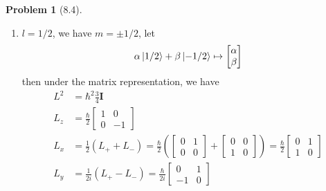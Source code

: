 \documentclass[twoside,11pt]{article}
\theoremstyle{definition}
\newtheorem{problem}{Problem}
\theoremstyle{remark}
\begin{document}
\begin{problem}[8.4]\
\begin{enumerate}[label=Case \arabic*., leftmargin=*]
\item $l=1/2$, we have $m=\pm 1/2$, let 
\begin{align*}
    \alpha\ket{1/2} + \beta\ket{-1/2} \mapsto
    \begin{bmatrix}
        \alpha\\ \beta
    \end{bmatrix}
\end{align*}
then under the matrix representation, we have
\begin{align*}
    L^2 &= \hbar^2 \frac{3}{4}\mathbf{I}\\
    L_z &= \frac{\hbar}{2}\begin{bmatrix}
        1 & 0\\
        0 & -1
    \end{bmatrix}\\
    L_x &= \frac{1}{2}(L_+ + L_-)
    = \frac{\hbar}{2}\left(
        \begin{bmatrix}
            0 & 1 \\ 0 & 0
        \end{bmatrix}
        + \begin{bmatrix}
            0 & 0 \\ 1 & 0
        \end{bmatrix}
    \right) = \frac{\hbar}{2}
    \begin{bmatrix}
        0 & 1\\ 1 & 0
    \end{bmatrix}\\
    L_y &= \frac{1}{2i}(L_+ - L_-) 
    = \frac{\hbar}{2i}\begin{bmatrix}
        0 & 1\\ -1 & 0
    \end{bmatrix}
\end{align*}


\end{enumerate}
\end{problem}
\end{document}
